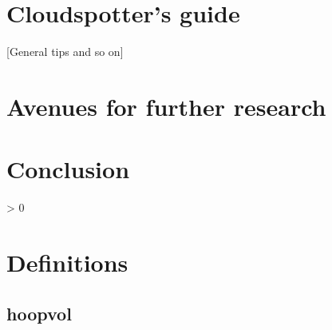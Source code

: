 \documentclass[
]{book}
\newlength{\cslhangindent}
\newenvironment{CSLReferences}[2] %
 {%
  \setlength{\parindent}{0pt}
  \ifodd #1 \everypar{\setlength{\hangindent}{\cslhangindent}}\ignorespaces\fi
  \ifnum #2 > 0
  \setlength{\parskip}{#2\baselineskip}
  \fi
 }%
 {}
\begin{document}
\hypertarget{cloudspotters-guide}{%
\chapter{Cloudspotter's guide}\label{cloudspotters-guide}}

{[}General tips and so on{]}

\hypertarget{avenues-for-further-research}{%
\chapter{Avenues for further research}\label{avenues-for-further-research}}

\hypertarget{conclusion}{%
\chapter{Conclusion}\label{conclusion}}

\hypertarget{refs}{}
\begin{CSLReferences}{0}{0}
\end{CSLReferences}

\hypertarget{appendix-appendix}{%
\appendix}


\hypertarget{definitions}{%
\chapter{Definitions}\label{definitions}}

\hypertarget{hoopvol}{%
\section*{hoopvol}\label{hoopvol}}

\providecommand{\docline}[3]{\noalign{\global\setlength{\arrayrulewidth}{#1}}\arrayrulecolor[HTML]{#2}\cline{#3}}

\setlength{\tabcolsep}{2pt}

\renewcommand*{\arraystretch}{1.5}
\end{document}
